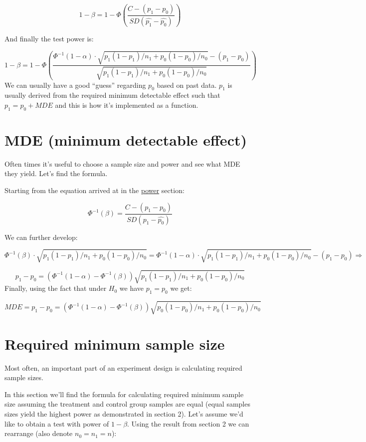 \documentclass[
]{article}
\begin{document}
\[1 - \beta  = 1 - \Phi\left(\frac{C - (p_1 - p_0)}{SD(\hat{p_1} - \hat{p_0})}\right)\]

And finally the test power is:

\[\boxed{1- \beta = 1 - \Phi\left(\frac{\Phi^{-1}(1 - \alpha) \cdot \sqrt{p_1(1-p_1)/n_1 + p_0(1-p_0)/n_0} - (p_1 - p_0)}{\sqrt{p_1(1-p_1)/n_1 + p_0(1-p_0)/n_0}}\right)}\]
We can usually have a good ``guess'' regarding \(p_0\) based on past
data. \(p_1\) is usually derived from the required minimum detectable
effect such that \(p_1 = p_0 + MDE\) and this is how it's implemented as
a function.

\hypertarget{mde-minimum-detectable-effect}{%
\section{MDE (minimum detectable
effect)}\label{mde-minimum-detectable-effect}}

Often times it's useful to choose a sample size and power and see what
MDE they yield. Let's find the formula.

Starting from the equation arrived at in the
\protect\hyperlink{power}{power} section:

\[\Phi^{-1}(\beta) = \frac{C - (p_1 - p_0)}{SD(\hat{p_1} - \hat{p_0})}\]

We can further develop:

\[\Phi^{-1}(\beta) \cdot \sqrt{p_1(1-p_1)/n_1 + p_0(1-p_0)/n_0} =  \Phi^{-1}(1 - \alpha) \cdot \sqrt{p_1(1-p_1)/n_1 + p_0(1-p_0)/n_0} - (p_1-p_0) \Rightarrow \]

\[p_1-p_0 = (\Phi^{-1}(1 - \alpha) - \Phi^{-1}(\beta))\sqrt{p_1(1-p_1)/n_1 + p_0(1-p_0)/n_0}\]
Finally, using the fact that under \(H_0\) we have \(p_1=p_0\) we get:

\[\boxed{MDE = p_1-p_0 = \left(\Phi^{-1}(1 - \alpha) - \Phi^{-1}(\beta)\right)\sqrt{p_0(1-p_0)/n_1 + p_0(1-p_0)/n_0}}\]

\hypertarget{required-minimum-sample-size}{%
\section{Required minimum sample
size}\label{required-minimum-sample-size}}

Most often, an important part of an experiment design is calculating
required sample sizes.

In this section we'll find the formula for calculating required minimum
sample size assuming the treatment and control group samples are equal
(equal samples sizes yield the highest power as demonstrated in section
2). Let's assume we'd like to obtain a test with power of \(1-\beta\).
Using the result from section 2 we can rearrange (also denote
\(n_0 = n_1 = n\)):
\end{document}
